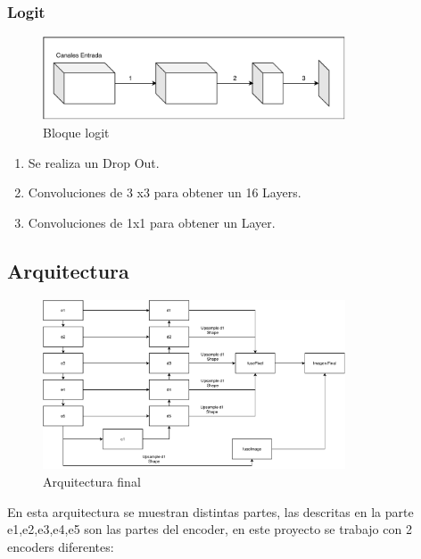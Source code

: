 \subsubsection{Logit}
\begin{figure}[H]
    \centering
    \includegraphics[width = 0.8\textwidth]{images/blocks/logitv2.pdf}
    \caption{Bloque logit}
    \label{fig:my_label}
\end{figure}{}
\begin{enumerate}
    \item Se realiza un Drop Out.
    \item Convoluciones de 3 x3 para obtener un 16 \gls{Layer}s.
    \item Convoluciones de 1x1 para obtener un \gls{Layer}.
\end{enumerate}{}
\subsection{Arquitectura}
\label{Sec:RedPropuesta}
\begin{figure}[H]
    \centering
    \includegraphics[width=0.8\textwidth]{images/blocks/arquitecturared.pdf}
    \caption{Arquitectura final}
    \label{fig:my_label}
\end{figure}

En esta arquitectura se muestran distintas partes, las descritas en la parte e1,e2,e3,e4,e5  son las partes del encoder, en este proyecto se trabajo con 2 encoders diferentes:
